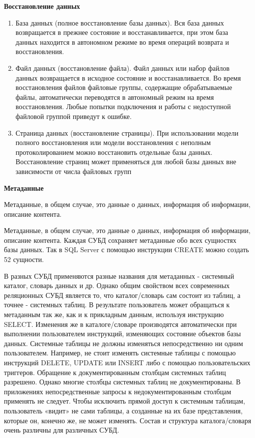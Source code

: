 \textbf{Восстановление данных}

\begin{enumerate}
	\item База данных (полное восстановление базы данных). Вся база данных возвращается в прежнее состояние и 
	восстанавливается, при этом база данных находится в автономном режиме во время операций возврата и 
	восстановления.
	\item Файл данных (восстановление файла). Файл данных или набор файлов данных возвращается в исходное состояние 
	и восстанавливается. Во время восстановления файлов файловые группы, содержащие обрабатываемые файлы, 
	автоматически переводятся в автономный режим на время восстановления. Любые попытки подключения и работы с 
	недоступной файловой группой приведут к ошибке.
	\item Страница данных (восстановление страницы). При использовании модели полного восстановления или модели 
	восстановления с неполным протоколированием можно восстановить отдельные базы данных. Восстановление 
	страниц может применяться для любой базы данных вне зависимости от числа файловых групп
\end{enumerate}

\textbf{Метаданные}

Метаданные, в общем случае, это данные о данных, информация об информации, описание контента.

Метаданные, в общем случае, это данные о данных, информация об
информации, описание контента. Каждая СУБД сохраняет метаданные обо
всех сущностях базы данных. Так в SQL Server с помощью инструкции
CREATE можно создать 52 сущности.

В разных СУБД применяются разные названия для метаданных -
системный каталог, словарь данных и др. Однако общим свойством всех
современных реляционных СУБД является то, что каталог/словарь сам
состоит из таблиц, а точнее - системных таблиц. В результате пользователь
может обращаться к метаданным так же, как и к прикладным данным,
используя инструкцию SELECT. Изменения же в каталоге/словаре
производятся автоматически при выполнении пользователем инструкций,
изменяющих состояние объектов базы данных. Системные таблицы не
должны изменяться непосредственно ни одним пользователем. Например,
не стоит изменять системные таблицы с помощью инструкций DELETE,
UPDATE или INSERT либо с помощью пользовательских триггеров.
Обращение к документированным столбцам системных таблиц разрешено.
Однако многие столбцы системных таблиц не документированы. В
приложениях непосредственные запросы к недокументированным
столбцам применять не следует. Чтобы исключить прямой доступ к
системным таблицам, пользователь «видит» не сами таблицы, а созданные
на их базе представления, которые он, конечно же, не может изменять.
Состав и структура каталога/словаря очень различны для различных СУБД.

